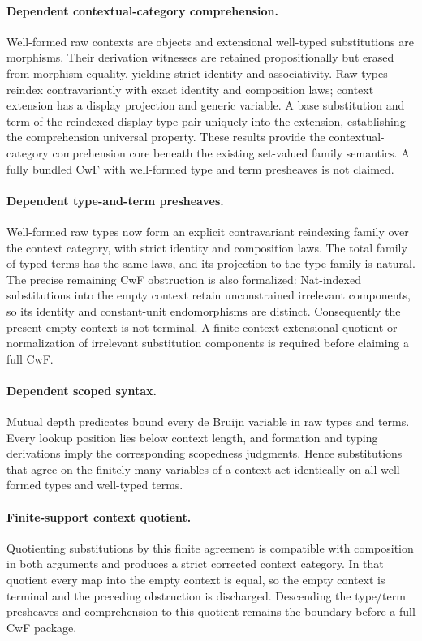 \documentclass[11pt]{article}
\theoremstyle{definition}
\begin{document}
\paragraph{Dependent contextual-category comprehension.}
Well-formed raw contexts are objects and extensional well-typed substitutions
are morphisms. Their derivation witnesses are retained propositionally but
erased from morphism equality, yielding strict identity and associativity.
Raw types reindex contravariantly with exact identity and composition laws;
context extension has a display projection and generic variable. A base
substitution and term of the reindexed display type pair uniquely into the
extension, establishing the comprehension universal property. These results
provide the contextual-category comprehension core beneath the existing
set-valued family semantics. A fully bundled CwF with well-formed type and term
presheaves is not claimed.

\paragraph{Dependent type-and-term presheaves.}
Well-formed raw types now form an explicit contravariant reindexing family over
the context category, with strict identity and composition laws. The total
family of typed terms has the same laws, and its projection to the type family
is natural. The precise remaining CwF obstruction is also formalized:
Nat-indexed substitutions into the empty context retain unconstrained irrelevant
components, so its identity and constant-unit endomorphisms are distinct.
Consequently the present empty context is not terminal. A finite-context
extensional quotient or normalization of irrelevant substitution components is
required before claiming a full CwF.

\paragraph{Dependent scoped syntax.}
Mutual depth predicates bound every de Bruijn variable in raw types and terms.
Every lookup position lies below context length, and formation and typing
derivations imply the corresponding scopedness judgments. Hence substitutions
that agree on the finitely many variables of a context act identically on all
well-formed types and well-typed terms.

\paragraph{Finite-support context quotient.}
Quotienting substitutions by this
finite agreement is compatible with composition in both arguments and produces
a strict corrected context category. In that quotient every map into the empty
context is equal, so the empty context is terminal and the preceding obstruction
is discharged. Descending the type/term presheaves and comprehension to this
quotient remains the boundary before a full CwF package.
\end{document}
